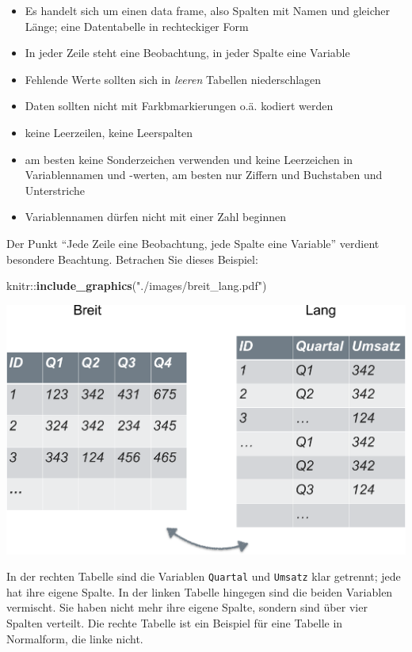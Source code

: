 \documentclass[12pt,]{book}
\newenvironment{Shaded}{\begin{snugshade}}{\end{snugshade}}
\newcommand{\KeywordTok}[1]{\textcolor[rgb]{0.13,0.29,0.53}{\textbf{{#1}}}}
\newcommand{\StringTok}[1]{\textcolor[rgb]{0.31,0.60,0.02}{{#1}}}
\newcommand{\NormalTok}[1]{{#1}}
\providecommand{\tightlist}{%
  \setlength{\itemsep}{0pt}\setlength{\parskip}{0pt}}
\begin{document}
\begin{itemize}
\tightlist
\item
  Es handelt sich um einen data frame, also Spalten mit Namen und
  gleicher Länge; eine Datentabelle in rechteckiger Form
\item
  In jeder Zeile steht eine Beobachtung, in jeder Spalte eine Variable
\item
  Fehlende Werte sollten sich in \emph{leeren} Tabellen niederschlagen
\item
  Daten sollten nicht mit Farkbmarkierungen o.ä. kodiert werden
\item
  keine Leerzeilen, keine Leerspalten
\item
  am besten keine Sonderzeichen verwenden und keine Leerzeichen in
  Variablennamen und -werten, am besten nur Ziffern und Buchstaben und
  Unterstriche
\item
  Variablennamen dürfen nicht mit einer Zahl beginnen
\end{itemize}

Der Punkt ``Jede Zeile eine Beobachtung, jede Spalte eine Variable''
verdient besondere Beachtung. Betrachen Sie dieses Beispiel:

\begin{Shaded}
\begin{Highlighting}[]
\NormalTok{knitr::}\KeywordTok{include_graphics}\NormalTok{(}\StringTok{"./images/breit_lang.pdf"}\NormalTok{)}
\end{Highlighting}
\end{Shaded}

\begin{center}\includegraphics[width=0.7\linewidth]{./images/breit_lang} \end{center}

In der rechten Tabelle sind die Variablen \texttt{Quartal} und
\texttt{Umsatz} klar getrennt; jede hat ihre eigene Spalte. In der
linken Tabelle hingegen sind die beiden Variablen vermischt. Sie haben
nicht mehr ihre eigene Spalte, sondern sind über vier Spalten verteilt.
Die rechte Tabelle ist ein Beispiel für eine Tabelle in Normalform, die
linke nicht.
\end{document}
